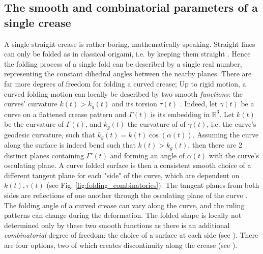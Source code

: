 \subsection{The smooth and combinatorial parameters of a single crease}
A single straight crease is rather boring, mathematically speaking. Straight lines can only be folded as in classical origami, i.e. by keeping them straight \cite{demaine_lens}. Hence the folding process of a single fold can be described by a single real number, representing the constant dihedral angles between the nearby planes. There are far more degrees of freedom for folding a curved crease; Up to rigid motion, a curved folding motion can locally be described by two smooth \textit{functions}: the curves' curvature $k(t) > k_g(t)$ and its torsion $\tau(t)$  \cite{more_on_paper, duncan_folded}. Indeed, let $\gamma(t)$ be a curve on a flattened crease pattern and $\Gamma(t)$ is its embedding in $\mathbb{R}^3$. Let $k(t)$ be the curvature of $\Gamma(t)$, and $k_g(t)$ the curvature of of $\gamma(t)$, i.e. the curve's geodesic curvature, such that $k_g(t) = k(t) \cos(\alpha(t))$. Assuming the curve along the surface is indeed bend such that $k(t) > k_g(t)$, then there are 2 distinct planes containing $\Gamma'(t)$ and forming an angle of $\alpha(t)$ with the curve's osculating plane. A curve folded surface is then a consistent smooth choice of a different tangent plane for each "side" of the curve, which are dependent on $k(t),\tau(t)$ (see Fig. \ref{fig:folding_combinatorics}). The tangent planes from both sides are reflections of one another through the osculating plane of the curve \cite{curved_folding_kilian}.
The folding angle of a curved crease can vary along the curve, and the ruling patterns can change during the deformation. The folded shape is locally not determined only by these two smooth functions as there is an additional \textit{combinatorial} degree of freedom: the choice of a surface at each side (see ). There are four options, two of which creates discontinuity along the crease (see ). %


